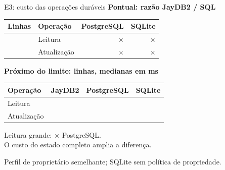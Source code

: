 \documentclass[aspectratio=169,12pt]{beamer}
\newcommand{\intpt}[1]{\pgfmathprintnumber[fixed,precision=0,use comma,1000 sep={\,}]{#1}}
\newcommand{\latpt}[1]{\pgfmathprintnumber[fixed,fixed zerofill,precision=3,use comma,1000 sep={\,}]{#1}}
\newcommand{\ratiopt}[1]{\pgfmathprintnumber[fixed,precision=1,use comma,1000 sep={\,}]{#1}}
\begin{document}
\begin{frame}{E3: custo das operações duráveis}
\small
\textbf{Pontual: razão JayDB2 / SQL}\par\vspace{1mm}
\begin{tabular}{@{}llrr@{}}\toprule
Linhas & Operação & PostgreSQL & SQLite\\\midrule
\intpt{\ScalingSmallRows} & Leitura & \ratiopt{\JayPointReadOverPostgres}$\times$ & \ratiopt{\JayPointReadOverSqlite}$\times$\\
\intpt{\ScalingSmallRows} & Atualização & \ratiopt{\JayPointUpdateOverPostgres}$\times$ & \ratiopt{\JayPointUpdateOverSqlite}$\times$\\\bottomrule
\end{tabular}
\par\vspace{1mm}
\textbf{Próximo do limite: \intpt{\ComparisonLargeRows} linhas, medianas em ms}\par\vspace{1mm}
\begin{tabular}{@{}lrrr@{}}\toprule
Operação & JayDB2 & PostgreSQL & SQLite\\\midrule
Leitura & \latpt{\LargeJayReadMs} & \latpt{\LargePgReadMs} & \latpt{\LargeSqReadMs}\\
Atualização & \latpt{\LargeJayWriteMs} & \latpt{\LargePgWriteMs} & \latpt{\LargeSqWriteMs}\\\bottomrule
\end{tabular}
\par\vspace{1mm}
Leitura grande: \ratiopt{\LargeJayReadOverPostgres}$\times$ PostgreSQL.\\
O custo do estado completo amplia a diferença.\par\vspace{1mm}
{\scriptsize Perfil de proprietário semelhante; SQLite sem política de propriedade.}

\end{frame}
\end{document}
